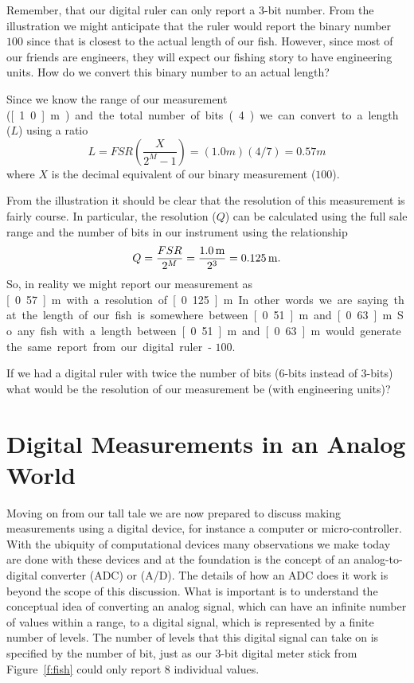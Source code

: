 Remember, that our digital ruler can only report a 3-bit number.  From the illustration we might anticipate that the ruler would report the binary number $100$ since that is closest to the actual length of our fish.  However, since most of our friends are engineers, they will expect our fishing story to have engineering units.  How do we convert this binary number to an actual length?

Since we know the range of our measurement (\unit[1.0]{m}) and the total number of bits (4) we can convert to a length ($L$) using a ratio
\begin{equation}
L = FSR \left(\frac{X}{2^M - 1}\right
) = (1.0 m)(4/7) = 0.57 m
\end{equation}
where $X$ is the decimal equivalent of our binary measurement ($100$).  

From the illustration it should be clear that the resolution of this measurement is fairly course.  In particular, the resolution ($Q$) can be calculated using the full sale range and the number of bits in our instrument using the relationship
\begin{equation}
Q = \frac{FSR}{2^M} = \frac{\unit[1.0]{m}}{2^3} = \unit[0.125]{m}.
\end{equation}
So, in reality we might report our measurement as \unit[0.57]{m} with a resolution of  \unit[0.125]{m}.  In other words we are saying that the length of our fish is somewhere between \unit[0.51]{m} and \unit[0.63]{m}.  So any fish with a length between \unit[0.51]{m} and \unit[0.63]{m} would generate the same report from our digital ruler - $100$.

\begin{ex}
If we had a digital ruler with twice the number of bits (6-bits instead of 3-bits) what would be the resolution of our measurement be (with engineering units)?
\end{ex}

\section{Digital Measurements in an Analog World}
\label{s:dac}
Moving on from our tall tale we are now prepared to discuss making measurements using a digital device, for instance a computer or micro-controller.  With the ubiquity of computational devices many observations we make today are done with these devices and at the foundation is the concept of an \gls{analog-to-digital converter} (ADC) or (A/D).  The details of how an ADC does it work is beyond the scope of this discussion.  What is important is to understand the conceptual idea of converting an analog signal, which can have an infinite number of values within a range, to a digital signal, which is represented by a finite number of levels.  The number of levels that this digital signal can take on is specified by the number of bit, just as our 3-bit digital meter stick from Figure~\ref{f:fish} could only report 8 individual values.  


